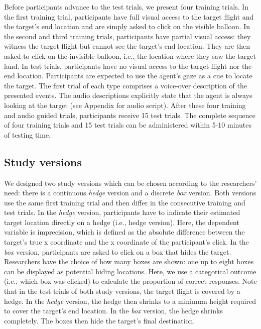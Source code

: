 \documentclass[
  english,
  man,floatsintext]{apa6}
\begin{document}
Before participants advance to the test trials, we present four training trials. In the first training trial, participants have full visual access to the target flight and the target's end location and are simply asked to click on the visible balloon. In the second and third training trials, participants have partial visual access: they witness the target flight but cannot see the target's end location. They are then asked to click on the invisible balloon, i.e., the location where they saw the target land. In test trials, participants have no visual access to the target flight nor the end location. Participants are expected to use the agent's gaze as a cue to locate the target. The first trial of each type comprises a voice-over description of the presented events. The audio descriptions explicitly state that the agent is always looking at the target (see Appendix for audio script). After these four training and audio guided trials, participants receive 15 test trials. The complete sequence of four training trials and 15 test trials can be administered within 5-10 minutes of testing time.

\hypertarget{study-versions}{%
\subsection{Study versions}\label{study-versions}}

We designed two study versions which can be chosen according to the researchers' need: there is a continuous \emph{hedge} version and a discrete \emph{box} version. Both versions use the same first training trial and then differ in the consecutive training and test trials.
In the \emph{hedge} version, participants have to indicate their estimated target location directly on a hedge (i.e., hedge version).
Here, the dependent variable is imprecision, which is defined as the absolute difference between the target's true x coordinate and the x coordinate of the participant's click.
In the \emph{box} version, participants are asked to click on a box that hides the target. Researchers have the choice of how many boxes are shown: one up to eight boxes can be displayed as potential hiding locations. Here, we use a categorical outcome (i.e., which box was clicked) to calculate the proportion of correct responses.
Note that in the test trials of both study versions, the target flight is covered by a hedge. In the \emph{hedge} version, the hedge then shrinks to a minimum height required to cover the target's end location. In the \emph{box} version, the hedge shrinks completely. The boxes then hide the target's final destination.
\end{document}
